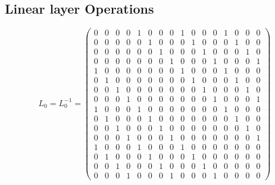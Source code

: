 \documentclass{transcrypto}
\begin{document}
	
	\begin{appendices}
	\appendix
	\section{Linear layer Operations}
	\label{sec}
	
	\begin{equation*}
	L_0 =  L_0^{-1} = 
	\begin{pmatrix}
	0 & 0 & 0 & 0 & 1 & 0 & 0 & 0 & 1 & 0 & 0 & 0 & 1 & 0 & 0 & 0\\
	0 & 0 & 0 & 0 & 0 & 1 & 0 & 0 & 0 & 1 & 0 & 0 & 0 & 1 & 0 & 0\\
	0 & 0 & 0 & 0 & 0 & 0 & 1 & 0 & 0 & 0 & 1 & 0 & 0 & 0 & 1 & 0\\
	0 & 0 & 0 & 0 & 0 & 0 & 0 & 1 & 0 & 0 & 0 & 1 & 0 & 0 & 0 & 1\\
	1 & 0 & 0 & 0 & 0 & 0 & 0 & 0 & 1 & 0 & 0 & 0 & 1 & 0 & 0 & 0\\
	0 & 1 & 0 & 0 & 0 & 0 & 0 & 0 & 0 & 1 & 0 & 0 & 0 & 1 & 0 & 0\\
	0 & 0 & 1 & 0 & 0 & 0 & 0 & 0 & 0 & 0 & 1 & 0 & 0 & 0 & 1 & 0\\
	0 & 0 & 0 & 1 & 0 & 0 & 0 & 0 & 0 & 0 & 0 & 1 & 0 & 0 & 0 & 1\\
	1 & 0 & 0 & 0 & 1 & 0 & 0 & 0 & 0 & 0 & 0 & 0 & 1 & 0 & 0 & 0\\
	0 & 1 & 0 & 0 & 0 & 1 & 0 & 0 & 0 & 0 & 0 & 0 & 0 & 1 & 0 & 0\\
	0 & 0 & 1 & 0 & 0 & 0 & 1 & 0 & 0 & 0 & 0 & 0 & 0 & 0 & 1 & 0\\   
	0 & 0 & 0 & 1 & 0 & 0 & 0 & 1 & 0 & 0 & 0 & 0 & 0 & 0 & 0 & 1\\
	1 & 0 & 0 & 0 & 1 & 0 & 0 & 0 & 1 & 0 & 0 & 0 & 0 & 0 & 0 & 0\\
	0 & 1 & 0 & 0 & 0 & 1 & 0 & 0 & 0 & 1 & 0 & 0 & 0 & 0 & 0 & 0\\   
	0 & 0 & 1 & 0 & 0 & 0 & 1 & 0 & 0 & 0 & 1 & 0 & 0 & 0 & 0 & 0\\
	0 & 0 & 0 & 1 & 0 & 0 & 0 & 1 & 0 & 0 & 0 & 1 & 0 & 0 & 0 & 0
	\end{pmatrix}
	\end{equation*}
	

\end{appendices}
\end{document}
